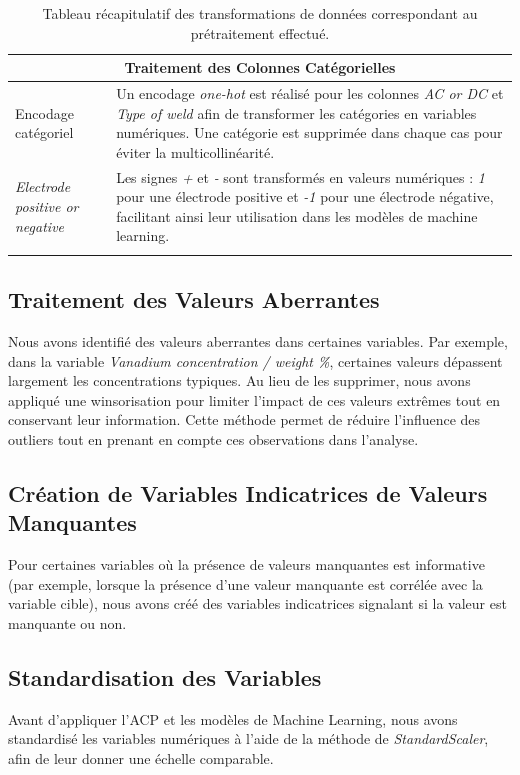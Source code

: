 \documentclass{article}
\begin{document}
\begin{longtable}{|p{4cm}|p{10cm}|}
\multicolumn{2}{|c|}{\textbf{Traitement des Colonnes Catégorielles}} \\ \hline
Encodage catégoriel & Un encodage \textit{one-hot} est réalisé pour les colonnes \textit{AC or DC} et \textit{Type of weld} afin de transformer les catégories en variables numériques. Une catégorie est supprimée dans chaque cas pour éviter la multicollinéarité. \\ \hline
\textit{Electrode positive or negative} & Les signes \textit{+} et \textit{-} sont transformés en valeurs numériques : \textit{1} pour une électrode positive et \textit{-1} pour une électrode négative, facilitant ainsi leur utilisation dans les modèles de machine learning. \\ \hline

\caption{Tableau récapitulatif des transformations de données correspondant au prétraitement effectué.}
\end{longtable}
    
\subsection{Traitement des Valeurs Aberrantes}

Nous avons identifié des valeurs aberrantes dans certaines variables. Par exemple, dans la variable \textit{Vanadium concentration / weight \%}, certaines valeurs dépassent largement les concentrations typiques. Au lieu de les supprimer, nous avons appliqué une winsorisation pour limiter l'impact de ces valeurs extrêmes tout en conservant leur information. Cette méthode permet de réduire l'influence des outliers tout en prenant en compte ces observations dans l'analyse.

\subsection{Création de Variables Indicatrices de Valeurs Manquantes}

Pour certaines variables où la présence de valeurs manquantes est informative (par exemple, lorsque la présence d'une valeur manquante est corrélée avec la variable cible), nous avons créé des variables indicatrices signalant si la valeur est manquante ou non.

\subsection{Standardisation des Variables}

Avant d'appliquer l'ACP et les modèles de Machine Learning, nous avons standardisé les variables numériques à l'aide de la méthode de \textit{StandardScaler}, afin de leur donner une échelle comparable.
\end{document}
